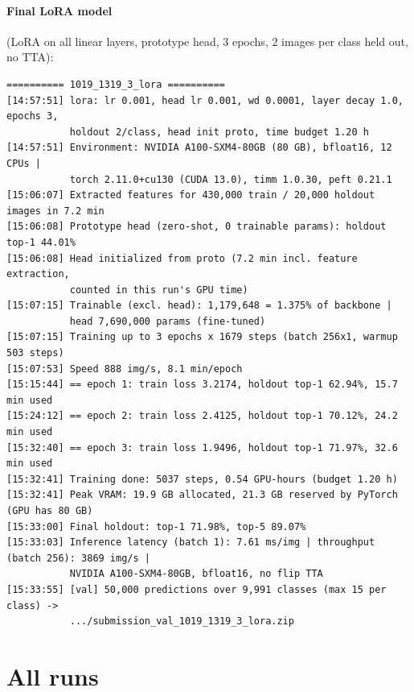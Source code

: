 \paragraph{Final LoRA model} (LoRA on all linear layers, prototype head, 3 epochs, 2 images per class held out, no TTA):
{\scriptsize
\begin{verbatim}
========== 1019_1319_3_lora ==========
[14:57:51] lora: lr 0.001, head lr 0.001, wd 0.0001, layer decay 1.0, epochs 3,
           holdout 2/class, head init proto, time budget 1.20 h
[14:57:51] Environment: NVIDIA A100-SXM4-80GB (80 GB), bfloat16, 12 CPUs |
           torch 2.11.0+cu130 (CUDA 13.0), timm 1.0.30, peft 0.21.1
[15:06:07] Extracted features for 430,000 train / 20,000 holdout images in 7.2 min
[15:06:08] Prototype head (zero-shot, 0 trainable params): holdout top-1 44.01%
[15:06:08] Head initialized from proto (7.2 min incl. feature extraction,
           counted in this run's GPU time)
[15:07:15] Trainable (excl. head): 1,179,648 = 1.375% of backbone |
           head 7,690,000 params (fine-tuned)
[15:07:15] Training up to 3 epochs x 1679 steps (batch 256x1, warmup 503 steps)
[15:07:53] Speed 888 img/s, 8.1 min/epoch
[15:15:44] == epoch 1: train loss 3.2174, holdout top-1 62.94%, 15.7 min used
[15:24:12] == epoch 2: train loss 2.4125, holdout top-1 70.12%, 24.2 min used
[15:32:40] == epoch 3: train loss 1.9496, holdout top-1 71.97%, 32.6 min used
[15:32:41] Training done: 5037 steps, 0.54 GPU-hours (budget 1.20 h)
[15:32:41] Peak VRAM: 19.9 GB allocated, 21.3 GB reserved by PyTorch (GPU has 80 GB)
[15:33:00] Final holdout: top-1 71.98%, top-5 89.07%
[15:33:03] Inference latency (batch 1): 7.61 ms/img | throughput (batch 256): 3869 img/s |
           NVIDIA A100-SXM4-80GB, bfloat16, no flip TTA
[15:33:55] [val] 50,000 predictions over 9,991 classes (max 15 per class) ->
           .../submission_val_1019_1319_3_lora.zip
\end{verbatim}
}

\section{All runs}
\label{sec:all-runs}

